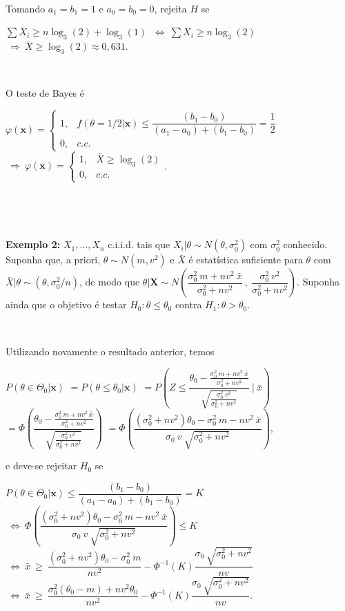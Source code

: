 \documentclass[
]{book}
\begin{document}
\(~\)

Tomando \(a_1=b_1=1\) e \(a_0=b_0=0\), rejeita \(H\) se

\(\sum X_i \geq n\log_3(2)+\log_3(1)\) \(~\Longleftrightarrow~ \sum X_i \geq n\log_3(2)\)
\(~\Longrightarrow~ \bar{X} \geq \log_3(2)\approx 0,631\).

\(~\)

O teste de Bayes é

\({\varphi}(\boldsymbol x) =\left\{\begin{array}{rl} 1,& f(\theta=1/2|\boldsymbol x) \leq \dfrac{(b_1-b_0)}{(a_1-a_0)+(b_1-b_0)} = \dfrac{1}{2} \\ 0,& c.c.\end{array}\right.\)
\(~\Longrightarrow~ {\varphi}(\boldsymbol x) =\left\{\begin{array}{rl} 1,& \bar{X} \geq \log_3(2) \\ 0,& c.c.\end{array}\right.\).

\(~\)

\(~\)

\textbf{Exemplo 2:} \(X_1,...,X_n\) c.i.i.d. tais que \(X_i|\theta\sim N(\theta,{\sigma}_0^2)\) com \({\sigma}_0^2\) conhecido. Suponha que, a priori, \(\theta \sim N(m,v^2)\) e \(\bar{X}\) é estatística suficiente para \(\theta\) com \(\bar{X}|\theta \sim \left(\theta,{\sigma}_0^2/n\right)\), de modo que \(\theta|\boldsymbol X \sim N\left(\dfrac{{\sigma}_0^2~m+nv^2~\bar x}{{\sigma}_0^2+nv^2}~,~\dfrac{{\sigma}_0^2~v^2}{{\sigma}_0^2+nv^2}\right)\). Suponha ainda que o objetivo é testar \(H_0: \theta\leq \theta_0\) contra \(H_1:\theta > \theta_0\).

\(~\)

Utilizando novamente o resultado anterior, temos

\(P\left(\theta\in\Theta_0|\boldsymbol x\right)\)
\(= P\left(\theta \leq \theta_0|\boldsymbol x\right)\)
\(= P\left(Z\leq\dfrac{\theta_0-\frac{{\sigma}_0^2~m+nv^2~\bar x}{{\sigma}_0^2+nv^2}}{\sqrt{\frac{{\sigma}_0^2~v^2}{{\sigma}_0^2+nv^2}}}~\Bigg|~\bar x\right)\)
\(= \Phi\left(\dfrac{\theta_0-\frac{{\sigma}_0^2~m+nv^2~\bar x}{{\sigma}_0^2+nv^2}}{\sqrt{\frac{{\sigma}_0^2~v^2}{{\sigma}_ 0^2+nv^2}}}\right)\)
\(= \Phi\left(\dfrac{({\sigma}_0^2+nv^2)\theta_0-{\sigma}_0^2~m-nv^2~\bar x}{{\sigma}_0~v~\sqrt{{\sigma}_ 0^2+nv^2}}\right)\),

e deve-se rejeitar \(H_0\) se

\(P\left(\theta\in\Theta_0|\boldsymbol x\right) \leq \dfrac{(b_1-b_0)}{(a_1-a_0)+(b_1-b_0)} = K\)
\(~\Longleftrightarrow~\Phi\left(\dfrac{({\sigma}_0^2+nv^2)\theta_0-{\sigma}_0^2~m-nv^2~\bar x}{{\sigma}_0~v~\sqrt{{\sigma}_ 0^2+nv^2}}\right) \leq K\)
\(~\Longleftrightarrow~ \bar x ~\geq~ \dfrac{({\sigma}_0^2+nv^2)\theta_0-{\sigma}_0^2~m}{nv^2} - {\Phi}^{-1}(K)\dfrac{{\sigma}_0~\sqrt{{\sigma}_ 0^2+nv^2}}{nv}\)
\(~\Longleftrightarrow~ \bar x ~\geq~ \dfrac{{\sigma}_0^2(\theta_0-m)+nv^2\theta_0}{nv^2} - {\Phi}^{-1}(K)\dfrac{{\sigma}_0~\sqrt{{\sigma}_ 0^2+nv^2}}{nv}\).
\end{document}
